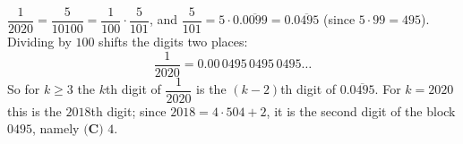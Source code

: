 $\dfrac{1}{2020}=\dfrac{5}{10100}=\dfrac{1}{100}\cdot\dfrac{5}{101}$, and $\dfrac{5}{101}=5\cdot0.\overline{0099}=0.\overline{0495}$ (since $5\cdot99=495$). Dividing by $100$ shifts the digits two places:
\[\dfrac{1}{2020}=0.00\,0495\,0495\,0495\ldots\]
So for $k\ge3$ the $k$th digit of $\dfrac1{2020}$ is the $(k-2)$th digit of $0.\overline{0495}$. For $k=2020$ this is the $2018$th digit; since $2018=4\cdot504+2$, it is the second digit of the block $0495$, namely $\boxed{\textbf{(C) }4}$.

